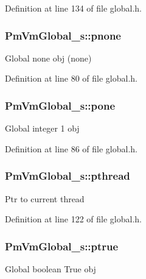 Definition at line 134 of file global.\-h.

\hypertarget{struct_pm_vm_global__s_a5c503e0cc9f53fd09bc0aa60e3518671}{
\subsubsection[{pnone}]{ Pm\-Vm\-Global\-\_\-s\-::pnone}}\label{struct_pm_vm_global__s_a5c503e0cc9f53fd09bc0aa60e3518671}
Global none obj (none) 

Definition at line 80 of file global.\-h.

\hypertarget{struct_pm_vm_global__s_aab300030689a352a16ddf31192091e2b}{
\subsubsection[{pone}]{ Pm\-Vm\-Global\-\_\-s\-::pone}}\label{struct_pm_vm_global__s_aab300030689a352a16ddf31192091e2b}
Global integer 1 obj 

Definition at line 86 of file global.\-h.

\hypertarget{struct_pm_vm_global__s_a578453c9a54fa53114a23a7177b15d2a}{
\subsubsection[{pthread}]{ Pm\-Vm\-Global\-\_\-s\-::pthread}}\label{struct_pm_vm_global__s_a578453c9a54fa53114a23a7177b15d2a}
Ptr to current thread 

Definition at line 122 of file global.\-h.

\hypertarget{struct_pm_vm_global__s_a92e7f34c075e121ca13696febf0ab6ea}{
\subsubsection[{ptrue}]{ Pm\-Vm\-Global\-\_\-s\-::ptrue}}\label{struct_pm_vm_global__s_a92e7f34c075e121ca13696febf0ab6ea}
Global boolean True obj 

